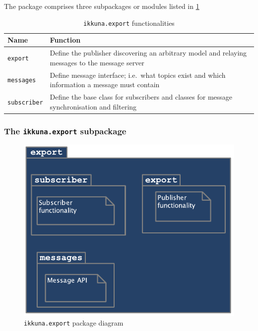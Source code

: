The package comprises three subpackages or modules listed in
\cref{tbl:ikkuna.export}

\begin{table}
    \caption{\texttt{ikkuna.export} functionalities}
    \label{tbl:ikkuna.export}
    \begin{tabularx}{\textwidth}{lX}
        \toprule
        Name                & Function\tabularnewline
        \midrule
        \texttt{export}     & Define the publisher discovering an arbitrary model and relaying messages to the message server\tabularnewline
        \texttt{messages}   & Define message interface; i.e.~what topics exist and which information a message must contain\tabularnewline
        \texttt{subscriber} & Define the base class for subscribers and classes for message synchronisation and filtering\tabularnewline
        \bottomrule
    \end{tabularx}
\end{table}

\subsubsection*{The \texttt{ikkuna.export} subpackage}

\begin{figure}
    \hypertarget{fig:pack-diag-export}{%
        \centering
        \includegraphics[max width=.7\textwidth]{gfx/diagrams/class_diagrams/export_package_diagram.pdf}
        \caption{\texttt{ikkuna.export} package diagram}\label{fig:pack-diag-export}
    }
\end{figure}

